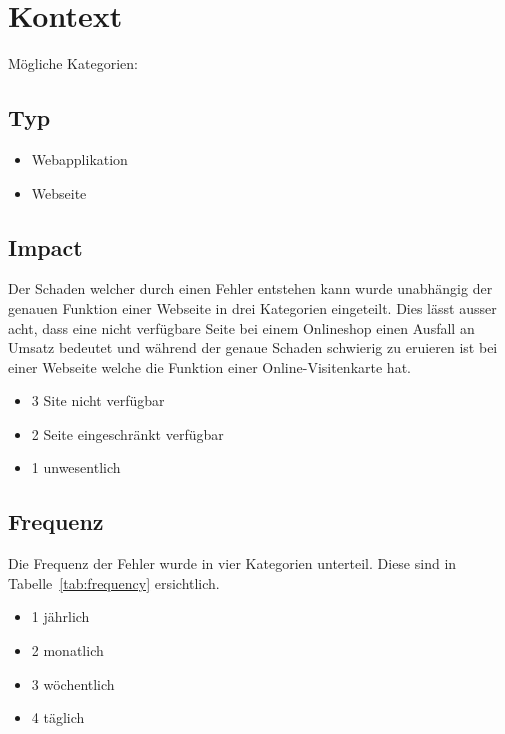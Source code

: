 
\section{Kontext}
\label{sec:kontext}


 \setcounter{fnumber}{0}
\renewcommand\thefnumber{F\arabic{fnumber}}
\newcommand{\newfnumber}[4]%
{%
\midrule%
\refstepcounter{fnumber}\label{f:#2}%
\thefnumber & #1 & #3 & #4 \\
}



Mögliche Kategorien:

\subsection{Typ}
\begin{itemize}
  \item Webapplikation
  \item Webseite
\end{itemize}

\subsection{Impact}
\label{sub:impact}
Der Schaden welcher durch einen Fehler entstehen kann wurde unabhängig der genauen Funktion einer Webseite in drei Kategorien eingeteilt. Dies lässt ausser acht, dass eine nicht verfügbare Seite bei einem Onlineshop einen Ausfall an Umsatz bedeutet und während der genaue Schaden schwierig zu eruieren ist bei einer Webseite welche die Funktion einer Online-Visitenkarte hat.

\begin{itemize}
  \item 3 Site nicht verfügbar
  \item 2 Seite eingeschränkt verfügbar
  \item 1 unwesentlich
\end{itemize}

\subsection{Frequenz}
\label{sub:frequenz}
Die Frequenz der Fehler wurde in vier Kategorien unterteil. Diese sind in Tabelle~\ref{tab:frequency} ersichtlich.


\begin{itemize}
    \item 1 jährlich
    \item 2 monatlich
    \item 3 wöchentlich
    \item 4 täglich
\end{itemize}


